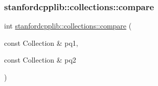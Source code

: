 \mbox{\label{classPriorityQueue_ac12ad2761ec7037f8866b726424a81e2}} 
\subsubsection{\texorpdfstring{stanfordcpplib\+::collections\+::compare}{stanfordcpplib::collections::compare}}
{\footnotesize\ttfamily int \mbox{\hyperlink{namespacestanfordcpplib_1_1collections_a6d113dfaa3d28a3894990c64411ff03c}{stanfordcpplib\+::collections\+::compare}} (\begin{DoxyParamCaption}\item[{const Collection \&}]{pq1,  }\item[{const Collection \&}]{pq2 }\end{DoxyParamCaption})\hspace{0.3cm}{\ttfamily [friend]}}

